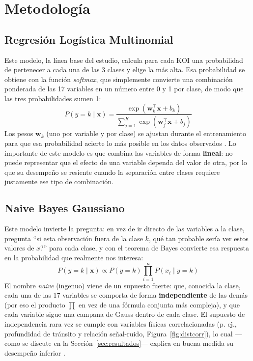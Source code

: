 \documentclass[10pt,journal]{IEEEtran}
\begin{document}
  \section{Metodolog\'ia}

  \subsection{Regresi\'on Log\'istica Multinomial}

  Este modelo, la l\'inea base del estudio, calcula para cada KOI una probabilidad de pertenecer a cada una de las 3 clases y elige la m\'as alta. Esa probabilidad se obtiene con la funci\'on \emph{softmax}, que simplemente convierte una combinaci\'on ponderada de las 17 variables en un n\'umero entre 0 y 1 por clase, de modo que las tres probabilidades sumen 1:
  \begin{equation}
    P(y=k \mid \mathbf{x}) = \frac{\exp(\mathbf{w}_k^{\top}\mathbf{x} + b_k)}{\sum_{j=1}^{K} \exp(\mathbf{w}_j^{\top}\mathbf{x} + b_j)}
    \label{eq:softmax}
  \end{equation}
  Los pesos $\mathbf{w}_k$ (uno por variable y por clase) se ajustan durante el entrenamiento para que esa probabilidad acierte lo m\'as posible en los datos observados \cite{hastie2009}. Lo importante de este modelo es que combina las variables de forma \textbf{lineal}: no puede representar que el efecto de una variable dependa del valor de otra, por lo que su desempe\~no se resiente cuando la separaci\'on entre clases requiere justamente ese tipo de combinaci\'on.

  \subsection{Naive Bayes Gaussiano}

  Este modelo invierte la pregunta: en vez de ir directo de las variables a la clase, pregunta ``si esta observaci\'on fuera de la clase $k$, \textquestiondown{}qu\'e tan probable ser\'ia ver estos valores de $x$?'' para cada clase, y con el teorema de Bayes convierte esa respuesta en la probabilidad que realmente nos interesa:
  \begin{equation}
    P(y=k \mid \mathbf{x}) \propto P(y=k) \prod_{i=1}^{n} P(x_i \mid y=k)
    \label{eq:naivebayes}
  \end{equation}
  El nombre \emph{naive} (ingenuo) viene de un supuesto fuerte: que, conocida la clase, cada una de las 17 variables se comporta de forma \textbf{independiente} de las dem\'as (por eso el producto $\prod$ en vez de una f\'ormula conjunta m\'as compleja), y que cada variable sigue una campana de Gauss dentro de cada clase. El supuesto de independencia rara vez se cumple con variables f\'isicas correlacionadas (p. ej., profundidad de tr\'ansito y relaci\'on se\~nal-ruido, Figura~\ref{fig:distcorr}), lo cual —como se discute en la Secci\'on~\ref{sec:resultados}— explica en buena medida su desempe\~no inferior \cite{rish2001}.
\end{document}
